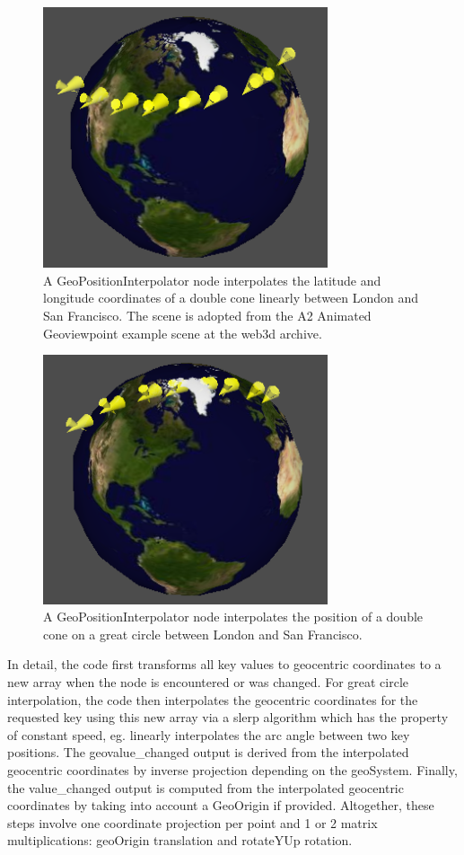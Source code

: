 \documentclass{acmsiggraph}                     %
\begin{document}
\begin{figure}[htbp] \centering \includegraphics[width=3.3in]{GeoPositionInterpolator1.png}
  \caption{A GeoPositionInterpolator node interpolates the latitude and longitude coordinates of a
  double cone linearly between London and San Francisco. The scene is adopted from the A2 Animated
Geoviewpoint example scene at the web3d archive.} \label{fig:GeoPositionInterpolator1.png}
\end{figure}

\begin{figure}[htbp] \centering \includegraphics[width=3.3in]{GeoPositionInterpolator2.png}
  \caption{A GeoPositionInterpolator node interpolates the position of a double cone on a great
  circle between London and San Francisco.} \label{fig:GeoPositionInterpolator2.png} \end{figure}

In detail, the code first transforms all key values to geocentric coordinates to a new array when
the node is encountered or was changed.  For great circle interpolation, the code then interpolates
the geocentric coordinates for the requested key using this new array via a slerp algorithm
\cite{shoemake1985} which has the property of constant speed, eg. linearly interpolates the arc angle
between two key positions. The geovalue\_changed output is derived from the interpolated geocentric
coordinates by inverse projection depending on the geoSystem. Finally, the  value\_changed output is
computed from the interpolated geocentric coordinates by taking into account a GeoOrigin if
provided. Altogether, these steps involve one coordinate projection per point and 1 or 2 matrix
multiplications: geoOrigin translation and rotateYUp rotation.
\end{document}
